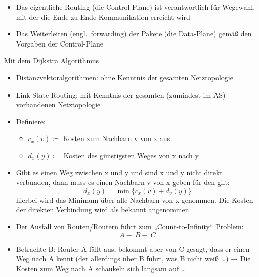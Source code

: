 
\begin{itemize}
    \item Das eigentliche Routing (die Control-Plane) ist verantwortlich für Wegewahl, mit der die Ende-zu-Ende-Kommunikation erreicht wird
    \item Das Weiterleiten (engl.\ forwarding) der Pakete (die Data-Plane) gemäß den Vorgaben der Control-Plane
\end{itemize}

Mit dem Dijkstra Algorithmus

\begin{itemize}
    \item Distanzvektoralgorithmen: ohne Kenntnis der gesamten Netztopologie
    \item Link-State Routing: mit Kenntnis der gesamten (zumindest im AS) vorhandenen Netztopologie
\end{itemize}

\begin{itemize}
    \item Definiere:
    \begin{itemize}
        \item \(c_x(v) \coloneqq\) Kosten zum Nachbarn v von x aus
        \item \(d_x(y) \coloneqq\) Kosten des günstigsten Weges von x nach y
    \end{itemize}
    \item Gibt es einen Weg zwischen x und y und sind x und y nicht direkt verbunden, dann muss es einen Nachbarn v von x geben für den gilt:
    \[d_x(y) = \min \{c_x(v) + d_v(y) \}\]
    hierbei wird das Minimum über alle Nachbarn von x genommen.
    Die Kosten der direkten Verbindung wird als bekannt angenommen
\end{itemize}

\begin{itemize}
    \item Der Ausfall von Routen/Routern führt zum „Count-to-Infinity“ Problem: \[A -\: B -\: C\]
    \item Betrachte B: Router A fällt aus, bekommt aber von C gesagt, dass er einen Weg nach A kennt (der allerdings über B führt, was B nicht weiß \ldots)
    → Die Kosten zum Weg nach A schaukeln sich langsam auf \ldots
\end{itemize}

